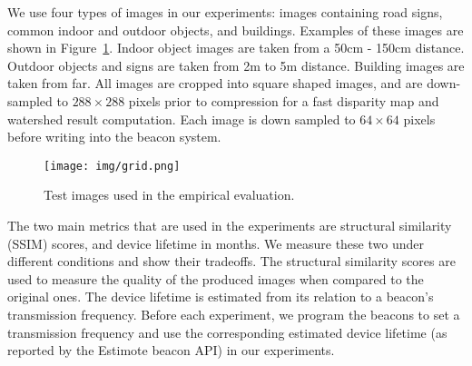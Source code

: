 We use four types of images in our experiments: images containing road signs, common indoor and outdoor objects, and buildings. Examples of these images are shown in Figure~\ref{fig:testimages}. Indoor object images are taken from a 50cm - 150cm distance. Outdoor objects and signs are taken from 2m to 5m distance. Building images are taken from far. All images are cropped into square shaped images, and are down-sampled to $288\times288$ pixels prior to compression for a fast disparity map and watershed result computation. Each image is down sampled to $64\times64$ pixels before writing into the beacon system.

\begin{figure}[!htb]
	\begin{center}
		\texttt{[image: img/grid.png]}
		\caption{Test images used in the empirical evaluation.}
		\label{fig:testimages}
	\end{center}
	\vspace{-1.5em}
\end{figure}

The two main metrics that are used in the experiments are structural similarity (SSIM) scores, and device lifetime in months. We measure these two under different conditions and show their tradeoffs. The structural similarity scores are used to measure the quality of the produced images when compared to the original ones. The device lifetime is estimated from its relation to a beacon's transmission frequency. Before each experiment, we program the beacons to set a transmission frequency and use the corresponding estimated device lifetime (as reported by the Estimote beacon API) in our experiments.




